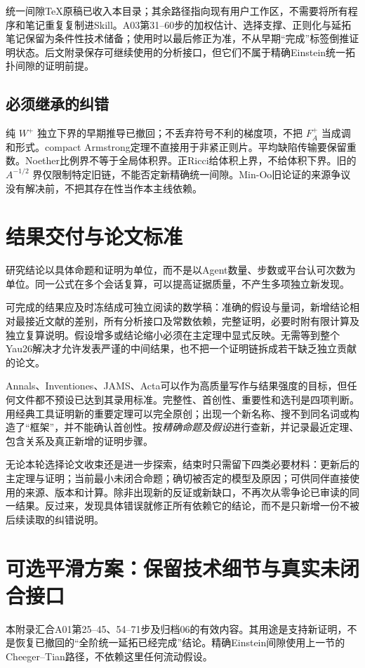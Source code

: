 \documentclass[UTF8,a4paper,11pt,fontset=fandol]{ctexart}
\numberwithin{equation}{section}
\theoremstyle{definition}
\begin{document}
统一间隙TeX原稿已收入本目录；其余路径指向现有用户工作区，不需要将所有程序和笔记重复复制进Skill。A03第31--60步的加权估计、选择支撑、正则化与延拓笔记保留为条件性技术储备；使用时以最后修正为准，不从早期“完成”标签倒推证明状态。后文附录保存可继续使用的分析接口，但它们不属于精确Einstein统一拓扑间隙的证明前提。

\subsection{必须继承的纠错}
纯 $W^+$ 独立下界的早期推导已撤回；不丢弃符号不利的梯度项，不把 $F_A^+$ 当成调和形式。compact Armstrong定理不直接用于非紧正则片。平均缺陷传输要保留重数。Noether比例界不等于全局体积界。正Ricci给体积上界，不给体积下界。旧的 $A^{-1/2}$ 界仅限制特定旧链，不能否定新精确统一间隙。Min-Oo旧论证的来源争议没有解决前，不把其存在性当作本主线依赖\cite{Ye1993}。

\section{结果交付与论文标准}
研究结论以具体命题和证明为单位，而不是以Agent数量、步数或平台认可次数为单位。同一公式在多个会话复算，可以提高证据质量，不产生多项独立新发现。

可完成的结果应及时冻结成可独立阅读的数学稿：准确的假设与量词，新增结论相对最接近文献的差别，所有分析接口及常数依赖，完整证明，必要时附有限计算及独立复算说明。假设增多或结论缩小必须在主定理中显式反映。无需等到整个Yau26解决才允许发表严谨的中间结果，也不把一个证明链拆成若干缺乏独立贡献的论文。

Annals、Inventiones、JAMS、Acta可以作为高质量写作与结果强度的目标，但任何文件都不预设已达到其录用标准。完整性、首创性、重要性和选刊是四项判断。用经典工具证明新的重要定理可以完全原创；出现一个新名称、搜不到同名词或构造了“框架”，并不能确认首创性。按\emph{精确命题及假设}进行查新，并记录最近定理、包含关系及真正新增的证明步骤。

无论本轮选择论文收束还是进一步探索，结束时只需留下四类必要材料：更新后的主定理与证明；当前最小未闭合命题；确切被否定的模型及原因；可供同伴直接使用的来源、版本和计算。除非出现新的反证或新缺口，不再次从零争论已审读的同一结果。反过来，发现具体错误就修正所有依赖它的结论，而不是只新增一份不被后续读取的纠错说明。

\appendix
\section{可选平滑方案：保留技术细节与真实未闭合接口}\label{app:flow}
本附录汇合A01第25--45、54--71步及归档06的有效内容。其用途是支持新证明，不是恢复已撤回的“全阶统一延拓已经完成”结论。精确Einstein间隙使用上一节的Cheeger--Tian路径，不依赖这里任何流动假设。
\end{document}
